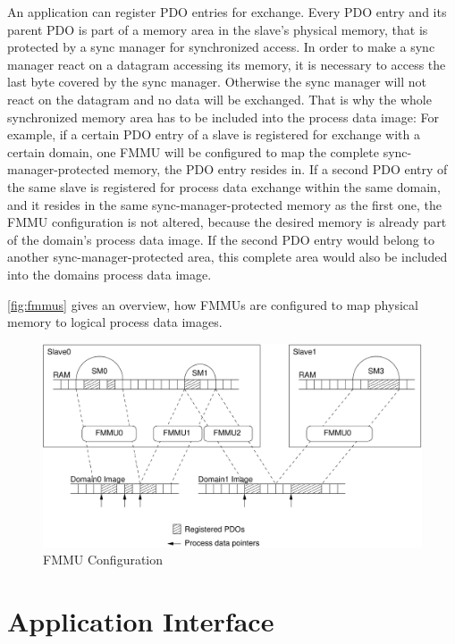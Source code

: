 \documentclass[a4paper,12pt,BCOR6mm,bibtotoc,idxtotoc]{scrbook}
\begin{document}
An application can register PDO entries for exchange. Every PDO entry and its
parent PDO is part of a memory area in the slave's physical memory, that is
protected by a sync manager \cite[sec.~6.7]{dlspec} for synchronized access.
In order to make a sync manager react on a datagram accessing its memory, it
is necessary to access the last byte covered by the sync manager. Otherwise
the sync manager will not react on the datagram and no data will be exchanged.
That is why the whole synchronized memory area has to be included into the
process data image: For example, if a certain PDO entry of a slave is
registered for exchange with a certain domain, one FMMU will be configured to
map the complete sync-manager-protected memory, the PDO entry resides in. If a
second PDO entry of the same slave is registered for process data exchange
within the same domain, and it resides in the same sync-manager-protected
memory as the first one, the FMMU configuration is not altered, because the
desired memory is already part of the domain's process data image. If the
second PDO entry would belong to another sync-manager-protected area, this
complete area would also be included into the domains process data image.

\autoref{fig:fmmus} gives an overview, how FMMUs are configured to map
physical memory to logical process data images.

\begin{figure}[htbp]
  \centering
  \includegraphics[width=\textwidth]{images/fmmus}
  \caption{FMMU Configuration}
  \label{fig:fmmus}
\end{figure}


\chapter{Application Interface}
\label{chap:api}
\end{document}
